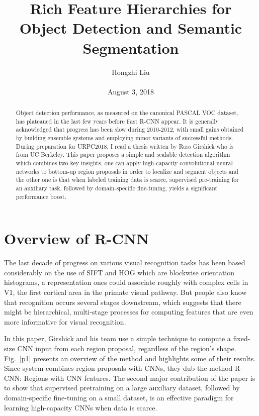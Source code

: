 \documentclass[10pt,twocolumn,letterpaper]{article}
\title{Rich Feature Hierarchies for Object Detection and Semantic Segmentation}
\author{Hongzhi Liu\\\\
August 3, 2018}
\begin{document}
\maketitle
\begin{abstract}
	Object detection performance, as measured on the canonical PASCAL VOC dataset, has plateaued in the last few years before Fast R-CNN appear. It is generally acknowledged that progress has been slow during 2010-2012, with small gains obtained by building ensemble systems and employing minor variants of successful methods. During preparation for URPC2018, I read a thesis written by Ross Girshick who is from UC Berkeley. This paper proposes a simple and scalable detection algorithm which combines two key insights, one can apply high-capacity convolutional neural networks to bottom-up region proposals in order to localize and segment objects and the other one is that when labeled training data is scarce, supervised pre-training for an auxiliary task, followed by domain-specific fine-tuning, yields a significant performance boost.
\end{abstract}

\section{Overview of R-CNN}

The last decade of progress on various visual recognition tasks has been based considerably on the use of SIFT \cite{Lowe2004Distinctive} and HOG \cite{Dalal2005Histograms} which are blockwise orientation histograms, a representation ones could associate roughly with complex cells in V1, the first cortical area in the primate visual pathway. But people also know that recognition occurs several stages downstream, which suggests that there might be hierarchical, multi-stage processes for computing features that are even more informative for visual recognition.

In this paper, Girshick and his team use a simple technique to compute a fixed-size CNN input from each region proposal, regardless of the region's shape. Fig.~\ref{p1} presents an overview of the method and highlights some of their results. Since system combines region proposals with CNNs, they dub the method R-CNN: Regions with CNN features. The second major contribution of the paper is to show that supervised pretraining on a large auxiliary dataset, followed by domain-specific fine-tuning on a small dataset, is an effective paradigm for learning high-capacity CNNs when data is scarce.
\end{document}
